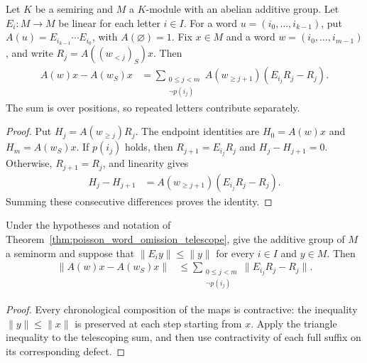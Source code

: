 \begin{theorem}
\label{thm:poisson_word_omission_telescope}
\leanok
{}
Let $K$ be a semiring and $M$ a $K$-module with an abelian additive group.
Let $E_i:M\to M$ be linear for each letter $i\in I$. For a word
$u=(i_0,\ldots,i_{k-1})$, put
$A(u)=E_{i_{k-1}}\cdots E_{i_0}$, with $A(\varnothing)=1$.
Fix $x\in M$ and a word $w=(i_0,\ldots,i_{m-1})$, and write
$R_j=A((w_{<j})_S)x$. Then
\begin{align}
 A(w)x-A(w_S)x
 &=\sum_{\substack{0\leq j<m\\\neg p(i_j)}}
 A(w_{\geq j+1})(E_{i_j}R_j-R_j).
 \label{eq:poisson_word_omission_telescope}
\end{align}
The sum is over positions, so repeated letters contribute separately.
\end{theorem}
\begin{proof}\leanok
{}
Put $H_j=A(w_{\geq j})R_j$. The endpoint identities are
$H_0=A(w)x$ and $H_m=A(w_S)x$. If $p(i_j)$ holds, then
$R_{j+1}=E_{i_j}R_j$ and $H_j-H_{j+1}=0$. Otherwise,
$R_{j+1}=R_j$, and linearity gives
\begin{align}
 H_j-H_{j+1}
 &=A(w_{\geq j+1})(E_{i_j}R_j-R_j).
\end{align}
Summing these consecutive differences proves the identity.
\end{proof}

\begin{theorem}
\label{thm:poisson_word_omission_norm}
\leanok
{}
Under the hypotheses and notation of
Theorem~\ref{thm:poisson_word_omission_telescope}, give the additive group
of $M$ a seminorm and suppose that $\|E_i y\|\leq\|y\|$ for every $i\in I$ and $y\in M$.
Then
\begin{align}
 \|A(w)x-A(w_S)x\|
 &\leq\sum_{\substack{0\leq j<m\\\neg p(i_j)}}
 \|E_{i_j}R_j-R_j\|.
 \label{eq:poisson_word_omission_norm}
\end{align}
\end{theorem}
\begin{proof}\leanok
{}
Every chronological composition of the maps is contractive: the inequality
$\|y\|\leq\|x\|$ is preserved at each step starting from $x$.
Apply the triangle inequality to the telescoping sum, and then use
contractivity of each full suffix on its corresponding defect.
\end{proof}

